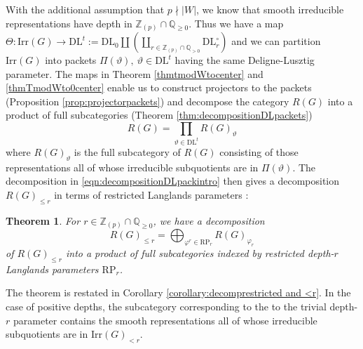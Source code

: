 \documentclass[11 pt]{article}
\numberwithin{equation}{subsection}
\newtheorem{theorem}{Theorem}[section]
\theoremstyle{definition}
\theoremstyle{remark}
\theoremstyle{conjecture}
\newcommand{\Irr}{\mathrm{Irr}}
\newcommand{\DL}{\mathrm{DL}}
\newcommand{\RP}{\mathrm{RP}}
\newcommand{\Z}{\mathbb Z}
\newcommand{\Q}{\mathbb Q}
\begin{document}
With the additional assumption that $p\nmid |W|$, we know that smooth irreducible representations have depth in $\Z_{(p)}\cap \Q_{\geq 0}$. Thus we have a map $\Theta: \Irr(G)\rightarrow \DL^t:=\DL_0\coprod \left(\coprod_{r \in \Z_{(p)}\cap \Q_{> 0}}\mathrm{DL}_r^\circ\right)$ and we can partition $\Irr(G)$ into packets $\Pi(\vartheta),\: \vartheta \in \DL^t$ having the same Deligne-Lusztig parameter. The maps in Theorem \ref{thmtmodWtocenter} and \ref{thmTmodWto0center} enable us to construct projectors to the packets (Proposition \ref{prop:projectorpackets})  and decompose the category $R(G)$ into a product of full subcategories (Theorem \ref{thm:decompositionDLpackets})
    \begin{equation}\label{eqn:decompositionDLpackintro}
        R(G) = \prod_{\vartheta\in \DL^t}R(G)_\vartheta
    \end{equation}
where $R(G)_\vartheta $ is the full subcategory of $R(G)$ consisting of those representations all of whose irreducible subquotients are in $\Pi(\vartheta)$. 
The decomposition in \eqref{eqn:decompositionDLpackintro} then gives a decomposition $R(G)_{\leq r}$ in terms of restricted Langlands parameters 
:
\begin{theorem}
For $r \in\Z_{(p)}\cap \Q_{\geq 0}$, we have a decomposition 
\begin{equation*}
  R(G)_{\leq r}= \bigoplus_{\varphi^r\in \RP_r}R(G)_{\varphi_r}  
\end{equation*}
of $R(G)_{\leq r}$ into a product of full subcategories indexed by restricted
depth-$r$ Langlands parameters $\RP_r$.
\end{theorem}
The theorem is restated in 
 Corollary \ref{corollary:decomprestricted and <r}.
In the case of positive depths, the subcategory corresponding to the to the trivial depth-$r$ parameter contains the smooth representations all of whose irreducible subquotients are in $\Irr(G)_{<r}$.
\end{document}
